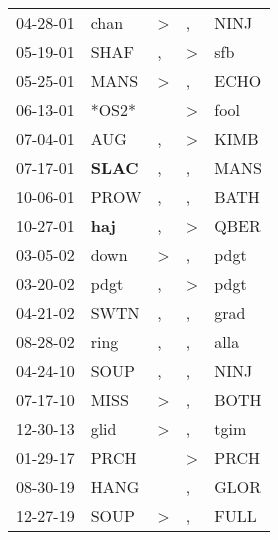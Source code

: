 \begin{supertabular}{p{0.07\textwidth}p{0.06\textwidth}p{0.02\textwidth}p{0.02\textwidth}p{0.06\textwidth}}
 04-28-01\textsuperscript{} &           chan\textsuperscript{} &     \textgreater &             , &           NINJ\textsuperscript{} \\
 05-19-01\textsuperscript{} &           SHAF\textsuperscript{} &                , &  \textgreater &            sfb\textsuperscript{} \\
 05-25-01\textsuperscript{} &           MANS\textsuperscript{} &     \textgreater &             , &           ECHO\textsuperscript{} \\
 06-13-01\textsuperscript{} &                            *OS2* &                  &  \textgreater &           fool\textsuperscript{} \\
 07-04-01\textsuperscript{} &            AUG\textsuperscript{} &                , &  \textgreater &           KIMB\textsuperscript{} \\
 07-17-01\textsuperscript{} &  \textbf{SLAC\textsuperscript{}} &                , &             , &           MANS\textsuperscript{} \\
 10-06-01\textsuperscript{} &           PROW\textsuperscript{} &                , &             , &           BATH\textsuperscript{} \\
 10-27-01\textsuperscript{} &   \textbf{haj\textsuperscript{}} &                , &  \textgreater &           QBER\textsuperscript{} \\
 03-05-02\textsuperscript{} &           down\textsuperscript{} &     \textgreater &             , &           pdgt\textsuperscript{} \\
 03-20-02\textsuperscript{} &           pdgt\textsuperscript{} &                , &  \textgreater &           pdgt\textsuperscript{} \\
 04-21-02\textsuperscript{} &           SWTN\textsuperscript{} &                , &             , &           grad\textsuperscript{} \\
 08-28-02\textsuperscript{} &           ring\textsuperscript{} &                , &             , &           alla\textsuperscript{} \\
 04-24-10\textsuperscript{} &           SOUP\textsuperscript{} &                , &             , &           NINJ\textsuperscript{} \\
 07-17-10\textsuperscript{} &           MISS\textsuperscript{} &     \textgreater &             , &           BOTH\textsuperscript{} \\
 12-30-13\textsuperscript{} &           glid\textsuperscript{} &     \textgreater &             , &           tgim\textsuperscript{} \\
 01-29-17\textsuperscript{} &           PRCH\textsuperscript{} &                  &  \textgreater &           PRCH\textsuperscript{} \\
 08-30-19\textsuperscript{} &           HANG\textsuperscript{} &                  &             , &           GLOR\textsuperscript{} \\
 12-27-19\textsuperscript{} &           SOUP\textsuperscript{} &     \textgreater &             , &           FULL\textsuperscript{} \\
\end{supertabular}
